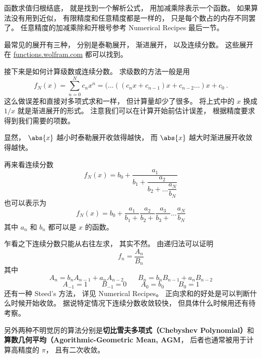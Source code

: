 
函数求值归根结底， 就是找到一个解析公式， 用加减乘除表示一个函数。 如果算法没有用到近似， 有限精度和任意精度都是一样的， 只是每个数占的内存不同罢了。 任意精度的加减乘除和开根号参考 Numerical Recipes 最后一节。

最常见的展开有三种， 分别是泰勒展开， 渐进展开， 以及连续分数。 这些展开在 \href{http://functions.wolfram.com}{functions.wolfram.com} 都可以找到。

接下来是如何计算级数或连续分数。 求级数的方法一般是用
\begin{equation}
f_N(x) = \sum_{n = 0}^N c_n x^n = (\dots ((c_n x + c_{n-1})x + c_{n-2} \dots )x + c_0~.
\end{equation}
这么做误差和直接对多项式求和一样， 但计算量却少了很多。 将上式中的 $x$ 换成 $1/x$ 就是渐进展开的形式。 注意我们可以在计算开始前估计误差， 根据精度要求得到我们需要的项数。

显然， $\abs{x}$ 越小时泰勒展开收敛得越快， 而 $\abs{x}$ 越大时渐进展开收敛得越快。

再来看连续分数
\begin{equation}
f_N(x) = b_0 + \dfrac{a_1}{b_1 + \dfrac{a_2}{b_2 + \dots \dfrac{a_N}{b_N}}}
\end{equation}
也可以表示为
\begin{equation}
f_N(x) = b_0 + \frac{a_1}{b_1 +} \frac{a_2}{b_2 +} \frac{a_3}{b_3 +} \dots \frac{a_N}{b_N}
\end{equation}
其中 $a_n$ 和 $b_n$ 都可以是 $x$ 的函数。

乍看之下连续分数只能从右往左求， 其实不然。 由递归法可以证明
\begin{equation}
f_n = \frac{A_n}{B_n}
\end{equation}
其中
\begin{equation}
A_n = b_n A_{n-1} + a_n A_{n-2} \qquad
B_n = b_n B_{n-1} + a_n B_{n-2}
\end{equation}
\begin{equation}
A_{-1} = 1 \qquad B_{-1} = 0
\qquad A_0 = b_0 \qquad B_0 = 1
\end{equation}
还有一种 Steed's 方法， 详见 Numerical Recipes。 正向求和的好处是可以判断什么时候开始收敛。
据说特定情况下连续分数收敛较快， 但具体什么时候用还有待考察。

另外两种不明觉厉的算法分别是\textbf{切比雪夫多项式（Chebyshev Polynomial）}和\textbf{算数几何平均（Agorithmic-Geometric Mean, AGM}， 后者也通常被用于计算高精度的 $\pi$， 且有二次收敛。
